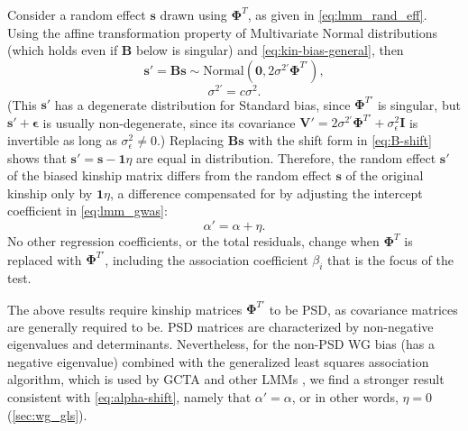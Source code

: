 \documentclass[9pt,twocolumn,twoside]{gsajnl}
\newcommand{\kinMat}[1][T]{\mathbf{\Phi}^{#1}}
\newcommand{\kinMatPrime}{\mathbf{\Phi}^{T\prime}}
\begin{document}
Consider a random effect $\mathbf{s}$ drawn using $\kinMat$, as given in \cref{eq:lmm_rand_eff}.
Using the affine transformation property of Multivariate Normal distributions (which holds even if $\mathbf{B}$ below is singular) and \cref{eq:kin-bias-general}, then
$$
\mathbf{s}'
=
\mathbf{B} \mathbf{s}
\sim
\text{Normal} \left( \mathbf{0}, 2 \sigma^{2\prime} \kinMatPrime \right),
$$
\begin{equation}
  \label{eq:sigma-rescale}
  \sigma^{2\prime} = c \sigma^2
  .
\end{equation}
(This $\mathbf{s}'$ has a degenerate distribution for Standard bias, since $\kinMatPrime$ is singular, but $\mathbf{s}' + \boldsymbol{\epsilon}$ is usually non-degenerate, since its covariance $\mathbf{V}' = 2 \sigma^{2\prime} \kinMatPrime + \sigma^2_\epsilon \mathbf{I}$ is invertible as long as $\sigma^2_\epsilon \ne 0$.)
Replacing $\mathbf{B} \mathbf{s}$ with the shift form in \cref{eq:B-shift} shows that
$\mathbf{s}' = \mathbf{s} - \mathbf{1} \eta$
are equal in distribution.
Therefore, the random effect $\mathbf{s}'$ of the biased kinship matrix differs from the random effect $\mathbf{s}$ of the original kinship only by $\mathbf{1} \eta$, a difference compensated for by adjusting the intercept coefficient in \cref{eq:lmm_gwas}:
\begin{equation}
  \label{eq:alpha-shift}
  \alpha' = \alpha + \eta.
\end{equation}
No other regression coefficients, or the total residuals, change when $\kinMat$ is replaced with $\kinMatPrime$, including the association coefficient $\beta_i$ that is the focus of the test.

The above results require kinship matrices $\kinMatPrime$ to be PSD, as covariance matrices are generally required to be.
PSD matrices are characterized by non-negative eigenvalues and determinants.
Nevertheless, for the non-PSD WG bias (has a negative eigenvalue) combined with the generalized least squares association algorithm, which is used by GCTA and other LMMs \citep{kang_efficient_2008, kang_variance_2010, yang_advantages_2014}, we find a stronger result consistent with \cref{eq:alpha-shift}, namely that $\alpha' = \alpha$, or in other words, $\eta = 0$ (\cref{sec:wg_gls}).
\end{document}
